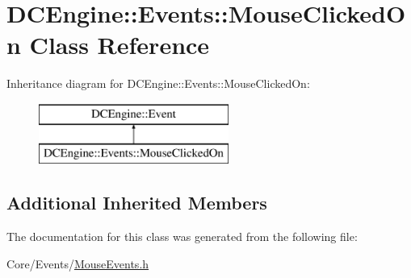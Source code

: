 \hypertarget{classDCEngine_1_1Events_1_1MouseClickedOn}{\section{D\-C\-Engine\-:\-:Events\-:\-:Mouse\-Clicked\-On Class Reference}
\label{classDCEngine_1_1Events_1_1MouseClickedOn}
}
Inheritance diagram for D\-C\-Engine\-:\-:Events\-:\-:Mouse\-Clicked\-On\-:\begin{figure}[H]
\begin{center}
\leavevmode
\includegraphics[height=2.000000cm]{classDCEngine_1_1Events_1_1MouseClickedOn}
\end{center}
\end{figure}
\subsection*{Additional Inherited Members}


The documentation for this class was generated from the following file\-:\begin{DoxyCompactItemize}
\item 
Core/\-Events/\hyperlink{MouseEvents_8h}{Mouse\-Events.\-h}\end{DoxyCompactItemize}
